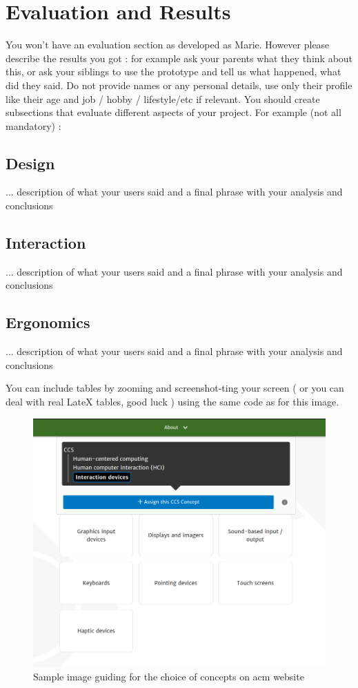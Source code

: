 \section{Evaluation and Results}
You won't have an evaluation section as developed as Marie. However please describe the results you got : for example ask your parents what they think about this, or ask your siblings to use the prototype and tell us what happened, what did they said. Do not provide names or any personal details, use only their profile like their age and job / hobby / lifestyle/etc if relevant. 
You should create subsections that evaluate different aspects of your project. For example (not all mandatory) : 
\subsection{Design}
... description of what your users said and a final phrase with your analysis and conclusions
\subsection{Interaction}
... description of what your users said and a final phrase with your analysis and conclusions
\subsection{Ergonomics}
... description of what your users said and a final phrase with your analysis and conclusions

You can include tables by zooming and screenshot-ting your screen ( or you can deal with real LateX tables, good luck ) using the same code as for this image.

\begin{figure}[h]
    \centering
    \includegraphics[width=1\columnwidth]{Figures/example.png}
    \caption{Sample image guiding for the choice of concepts on acm website}
    \label{fig:sample}
\end{figure}


